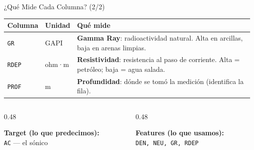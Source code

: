 \documentclass[aspectratio=169, 11pt]{beamer}
\begin{document}
\begin{frame}{¿Qué Mide Cada Columna? (2/2)}
  \vspace{-6pt}
  \centering
  {\footnotesize
  \renewcommand{\arraystretch}{1.5}
  \begin{tabular}{@{}l l p{6.6cm}@{}}
    \toprule
    {\bfseries\color{arcaRed} Columna} & {\bfseries\color{arcaDark} Unidad}
      & {\bfseries\color{arcaDark} Qué mide} \\
    \midrule
    \texttt{GR} & GAPI
      & \textbf{Gamma Ray}: radioactividad natural. Alta en arcillas, baja en arenas limpias. \\
    \texttt{RDEP} & ohm·m
      & \textbf{Resistividad}: resistencia al paso de corriente. Alta = petróleo; baja = agua salada. \\
    \texttt{PROF} & m
      & \textbf{Profundidad}: dónde se tomó la medición (identifica la fila). \\
    \bottomrule
  \end{tabular}
  }

  \vspace{8pt}
  \begin{columns}[T]
    \begin{column}{0.48\textwidth}
      \begin{tcolorbox}[colback=arcaGray, colframe=codeGreen, boxrule=0pt,
        leftrule=3pt, arc=3pt, left=6pt, right=6pt, top=4pt, bottom=4pt]
        {\scriptsize\color{arcaDark}\bfseries\faBullseye\hspace{4pt}Target (lo que predecimos):}\\[2pt]
        {\scriptsize\color{textMuted} \texttt{AC} --- el sónico}
      \end{tcolorbox}
    \end{column}
    \begin{column}{0.48\textwidth}
      \begin{tcolorbox}[colback=arcaGray, colframe=arcaRed, boxrule=0pt,
        leftrule=3pt, arc=3pt, left=6pt, right=6pt, top=4pt, bottom=4pt]
        {\scriptsize\color{arcaDark}\bfseries\faSlidersH\hspace{4pt}Features (lo que usamos):}\\[2pt]
        {\scriptsize\color{textMuted} \texttt{DEN, NEU, GR, RDEP}}
      \end{tcolorbox}
    \end{column}
  \end{columns}
\end{frame}
\end{document}
